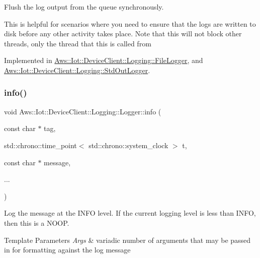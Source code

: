 Flush the log output from the queue synchronously. 

This is helpful for scenarios where you need to ensure that the logs are written to disk before any other activity takes place. Note that this will not block other threads, only the thread that this is called from 

Implemented in \hyperlink{class_aws_1_1_iot_1_1_device_client_1_1_logging_1_1_file_logger_a507513cb4aca226a5ed6da292bfd915a}{Aws\+::\+Iot\+::\+Device\+Client\+::\+Logging\+::\+File\+Logger}, and \hyperlink{class_aws_1_1_iot_1_1_device_client_1_1_logging_1_1_std_out_logger_a27610c8adc232399266ef8c8f09eb46b}{Aws\+::\+Iot\+::\+Device\+Client\+::\+Logging\+::\+Std\+Out\+Logger}.

\mbox{\label{class_aws_1_1_iot_1_1_device_client_1_1_logging_1_1_logger_a9ac04311763fcffa096eb062ba479897}} 
\subsubsection{\texorpdfstring{info()}{info()}}
{\footnotesize\ttfamily void Aws\+::\+Iot\+::\+Device\+Client\+::\+Logging\+::\+Logger\+::info (\begin{DoxyParamCaption}\item[{const char $\ast$}]{tag,  }\item[{std\+::chrono\+::time\+\_\+point$<$ std\+::chrono\+::system\+\_\+clock $>$}]{t,  }\item[{const char $\ast$}]{message,  }\item[{}]{... }\end{DoxyParamCaption})\hspace{0.3cm}{\ttfamily [inline]}}



Log the message at the I\+N\+FO level. If the current logging level is less than I\+N\+FO, then this is a N\+O\+OP. 


\begin{DoxyTemplParams}{Template Parameters}
{\em Args} & variadic number of arguments that may be passed in for formatting against the log message \\
\hline
\end{DoxyTemplParams}

